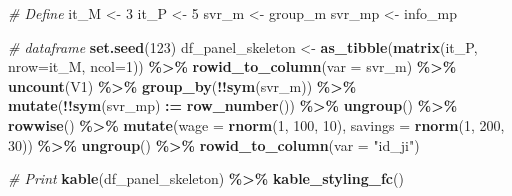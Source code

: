 \documentclass[
]{book}
\newenvironment{Shaded}{\begin{snugshade}}{\end{snugshade}}
\newcommand{\CommentTok}[1]{\textcolor[rgb]{0.56,0.35,0.01}{\textit{#1}}}
\newcommand{\DataTypeTok}[1]{\textcolor[rgb]{0.13,0.29,0.53}{#1}}
\newcommand{\DecValTok}[1]{\textcolor[rgb]{0.00,0.00,0.81}{#1}}
\newcommand{\ErrorTok}[1]{\textcolor[rgb]{0.64,0.00,0.00}{\textbf{#1}}}
\newcommand{\KeywordTok}[1]{\textcolor[rgb]{0.13,0.29,0.53}{\textbf{#1}}}
\newcommand{\NormalTok}[1]{#1}
\newcommand{\OperatorTok}[1]{\textcolor[rgb]{0.81,0.36,0.00}{\textbf{#1}}}
\newcommand{\StringTok}[1]{\textcolor[rgb]{0.31,0.60,0.02}{#1}}
\begin{document}
\begin{Shaded}
\begin{Highlighting}[]
\CommentTok{\# Define}
\NormalTok{it\_M \textless{}{-}}\StringTok{ }\DecValTok{3}
\NormalTok{it\_P \textless{}{-}}\StringTok{ }\DecValTok{5}
\NormalTok{svr\_m \textless{}{-}}\StringTok{ \textquotesingle{}group\_m\textquotesingle{}}
\NormalTok{svr\_mp \textless{}{-}}\StringTok{ \textquotesingle{}info\_mp\textquotesingle{}}

\CommentTok{\# dataframe}
\KeywordTok{set.seed}\NormalTok{(}\DecValTok{123}\NormalTok{)}
\NormalTok{df\_panel\_skeleton \textless{}{-}}\StringTok{ }\KeywordTok{as\_tibble}\NormalTok{(}\KeywordTok{matrix}\NormalTok{(it\_P, }\DataTypeTok{nrow=}\NormalTok{it\_M, }\DataTypeTok{ncol=}\DecValTok{1}\NormalTok{)) }\OperatorTok{\%\textgreater{}\%}
\StringTok{  }\KeywordTok{rowid\_to\_column}\NormalTok{(}\DataTypeTok{var =}\NormalTok{ svr\_m) }\OperatorTok{\%\textgreater{}\%}
\StringTok{  }\KeywordTok{uncount}\NormalTok{(V1) }\OperatorTok{\%\textgreater{}\%}
\StringTok{  }\KeywordTok{group\_by}\NormalTok{(}\OperatorTok{!!}\KeywordTok{sym}\NormalTok{(svr\_m)) }\OperatorTok{\%\textgreater{}\%}\StringTok{ }\KeywordTok{mutate}\NormalTok{(}\OperatorTok{!!}\KeywordTok{sym}\NormalTok{(svr\_mp) }\OperatorTok{:}\ErrorTok{=}\StringTok{ }\KeywordTok{row\_number}\NormalTok{()) }\OperatorTok{\%\textgreater{}\%}
\StringTok{  }\KeywordTok{ungroup}\NormalTok{() }\OperatorTok{\%\textgreater{}\%}
\StringTok{  }\KeywordTok{rowwise}\NormalTok{() }\OperatorTok{\%\textgreater{}\%}\StringTok{ }\KeywordTok{mutate}\NormalTok{(}\DataTypeTok{wage =} \KeywordTok{rnorm}\NormalTok{(}\DecValTok{1}\NormalTok{, }\DecValTok{100}\NormalTok{, }\DecValTok{10}\NormalTok{), }
                       \DataTypeTok{savings =} \KeywordTok{rnorm}\NormalTok{(}\DecValTok{1}\NormalTok{, }\DecValTok{200}\NormalTok{, }\DecValTok{30}\NormalTok{)) }\OperatorTok{\%\textgreater{}\%}
\StringTok{  }\KeywordTok{ungroup}\NormalTok{() }\OperatorTok{\%\textgreater{}\%}\StringTok{ }
\StringTok{  }\KeywordTok{rowid\_to\_column}\NormalTok{(}\DataTypeTok{var =} \StringTok{"id\_ji"}\NormalTok{)}

\CommentTok{\# Print}
\KeywordTok{kable}\NormalTok{(df\_panel\_skeleton) }\OperatorTok{\%\textgreater{}\%}\StringTok{ }\KeywordTok{kable\_styling\_fc}\NormalTok{()}
\end{Highlighting}
\end{Shaded}
\end{document}
